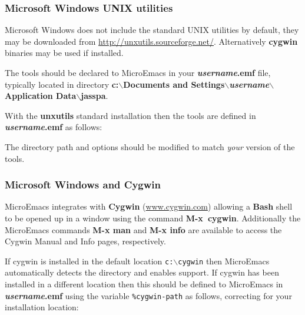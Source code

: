 \documentclass[11pt,a4paper,pdftex]{article}
\begin{document}
\subsubsection{Microsoft Windows UNIX utilities}

  Microsoft Windows does not include the standard UNIX utilities by default,
  they may be downloaded from
  \href{http://unxutils.sourceforge.net/}{http://unxutils.sourceforge.net/}.
  Alternatively \textbf{cygwin} binaries may be used if installed.

  The tools should be declared to MicroEmacs in your
  \textbf{\textit{username}.emf} file, typically located in directory
  \textbf{c:$\backslash$Documents and
  Settings$\backslash$\textit{username}$\backslash$Application
  Data$\backslash$jasspa}.

  With the \textbf{unxutils} standard installation
  then the tools are defined in \textbf{\textit{username}.emf} as follows:


  The directory path and options should be modified to match \textit{your}
  version of the tools.

\subsubsection{Microsoft Windows and Cygwin}

  MicroEmacs integrates with \textbf{Cygwin}
  (\href{http://www.cygwin.com}{www.cygwin.com}) allowing a \textbf{Bash}
  shell to be opened up in a window using the command \textbf{M-x\ cygwin}.
  Additionally the MicroEmacs commands \textbf{M-x man} and \textbf{M-x
  info} are available to access the Cygwin Manual and Info pages,
  respectively.

  If cygwin is installed in the default location \texttt{c:$\backslash$cygwin}
  then MicroEmacs automatically detects the directory and enables support. If
  cygwin has been installed in a different location then this should be
  defined to MicroEmacs in \textbf{\textit{username}.emf} using the variable
  \texttt{\%cygwin-path} as follows, correcting for your installation
  location:
\end{document}
